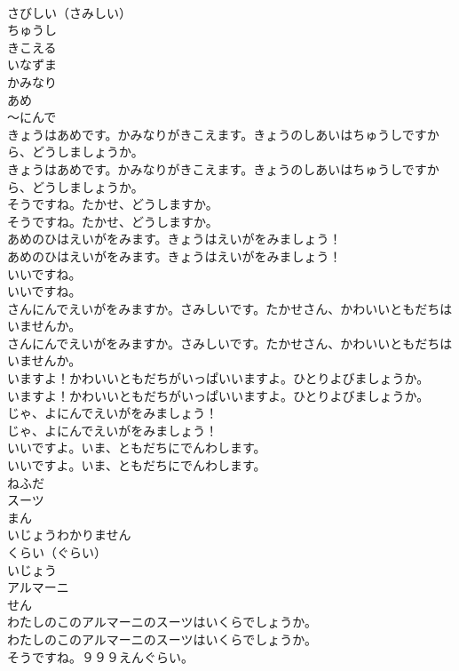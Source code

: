 \documentclass[8pt]{extreport}
\begin{document}
\begin{CJK}{UTF8}{min}
\\	さびしい（さみしい）
\\	ちゅうし
\\	きこえる
\\	いなずま
\\	かみなり
\\	あめ
\\	～にんで
\\	きょうはあめです。かみなりがきこえます。きょうのしあいはちゅうしですから、どうしましょうか。	
\\	きょうはあめです。かみなりがきこえます。きょうのしあいはちゅうしですから、どうしましょうか。 
\\	そうですね。たかせ、どうしますか。	
\\	そうですね。たかせ、どうしますか。 
\\	あめのひはえいがをみます。きょうはえいがをみましょう！	
\\	あめのひはえいがをみます。きょうはえいがをみましょう！ 
\\	いいですね。	
\\	いいですね。 
\\	さんにんでえいがをみますか。さみしいです。たかせさん、かわいいともだちはいませんか。	
\\	さんにんでえいがをみますか。さみしいです。たかせさん、かわいいともだちはいませんか。 
\\	いますよ！かわいいともだちがいっぱいいますよ。ひとりよびましょうか。	
\\	いますよ！かわいいともだちがいっぱいいますよ。ひとりよびましょうか。 
\\	じゃ、よにんでえいがをみましょう！	
\\	じゃ、よにんでえいがをみましょう！ 
\\	いいですよ。いま、ともだちにでんわします。	
\\	いいですよ。いま、ともだちにでんわします。 
\\	ねふだ
\\	スーツ
\\	まん
\\	いじょうわかりません
\\	くらい（ぐらい）
\\	いじょう
\\	アルマーニ
\\	せん
\\	わたしのこのアルマーニのスーツはいくらでしょうか。	
\\	わたしのこのアルマーニのスーツはいくらでしょうか。 
\\	そうですね。９９９えんぐらい。	

\end{CJK}
\end{document}
